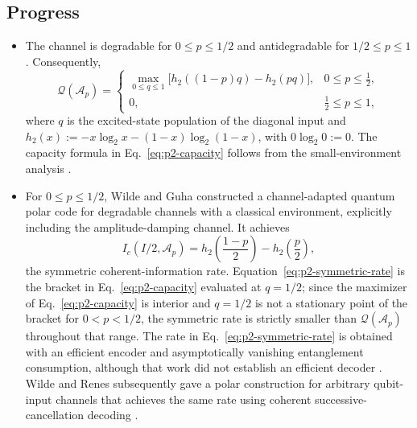 \subsection*{Progress}

\begin{itemize}
  \item The channel is degradable for $0\le p\le1/2$ and antidegradable for
  $1/2\le p\le1$.  Consequently,
  \begin{equation}
    \mathcal{Q}(\mathcal A_p)=
    \begin{cases}
      \displaystyle\max_{0\le q\le1}
      \bigl[h_2((1-p)q)-h_2(pq)\bigr],&0\le p\le\tfrac12,\\[1.5mm]
      0,&\tfrac12\le p\le1,
    \end{cases}
    \label{eq:p2-capacity}
  \end{equation}
  where $q$ is the excited-state population of the diagonal input and
  $h_2(x):=-x\log_2x-(1-x)\log_2(1-x)$, with $0\log_2 0:=0$.  The capacity formula in
  Eq.~\eqref{eq:p2-capacity} follows from the small-environment analysis
  .

  \item For $0\le p\le1/2$, Wilde and Guha constructed a channel-adapted
  quantum polar code for degradable channels with a classical environment,
  explicitly including the amplitude-damping channel.  It achieves
  \begin{equation}
    I_c(I/2,\mathcal A_p)
    =h_2\!\left(\frac{1-p}{2}\right)-h_2\!\left(\frac p2\right),
    \label{eq:p2-symmetric-rate}
  \end{equation}
  the symmetric coherent-information rate.  Equation~\eqref{eq:p2-symmetric-rate}
  is the bracket in Eq.~\eqref{eq:p2-capacity} evaluated at $q=1/2$; since the
  maximizer of Eq.~\eqref{eq:p2-capacity} is interior and $q=1/2$ is not a
  stationary point of the bracket for $0<p<1/2$, the symmetric rate is
  strictly smaller than $\mathcal{Q}(\mathcal A_p)$ throughout that range.
  The rate in Eq.~\eqref{eq:p2-symmetric-rate} is obtained with an efficient
  encoder and
  asymptotically vanishing entanglement consumption, although that work did
  not establish an efficient decoder .
  Wilde and Renes subsequently gave a polar construction for arbitrary
  qubit-input channels that achieves the same rate using coherent
  successive-cancellation decoding .


\end{itemize}
